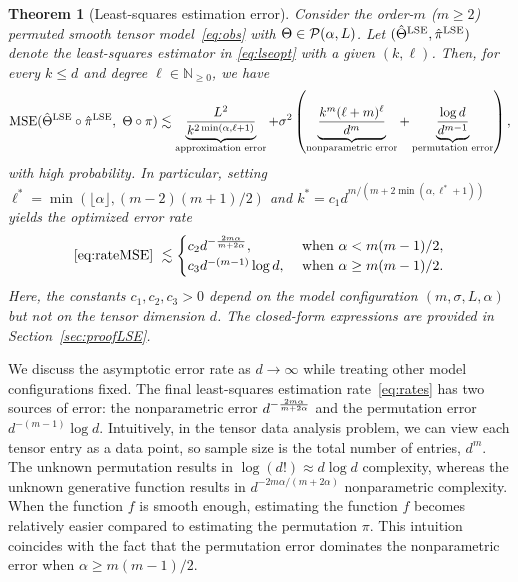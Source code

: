 \documentclass[11pt]{article}
\newtheorem{thm}{Theorem}
\theoremstyle{definition}
\newcommand*{\KeepStyleUnderBrace}[1]{%
  \mathop{%
    \mathchoice
    {\underbrace{\displaystyle#1}}%
    {\underbrace{\textstyle#1}}%
    {\underbrace{\scriptstyle#1}}%
    {\underbrace{\scriptscriptstyle#1}}%
  }\limits
}
\begin{document}
\begin{thm}[Least-squares estimation error]\label{thm:LSE} Consider the order-$m$ ($m\geq 2$) permuted smooth tensor model~\eqref{eq:obs} with $\Theta\in\mathcal{P}(\alpha,L)$.
Let $(\hat\Theta^{\textup{LSE}},\hat\pi^{\textup{LSE}})$ denote the least-squares estimator in \eqref{eq:lseopt} with a given $(k,\ell)$. Then, for every $k\leq d$ and degree $\ell\in \mathbb{N}_{\geq 0}$, we have
\begin{align}\label{eq:rateMSE}
\textup{MSE}(\hat\Theta^{\textup{LSE}}\circ\hat\pi^{\textup{LSE}},\ \Theta\circ\pi)\lesssim \KeepStyleUnderBrace{\frac{L^2}{k^{2\min(\alpha,\ell+1)}}}_{\textup{approximation error}}+ \sigma^2\left(\KeepStyleUnderBrace{\frac{k^m(\ell+m)^\ell}{d^m}}_{\textup{nonparametric error}}+\KeepStyleUnderBrace{\frac{\log d}{d^{m-1}}}_{\textup{permutation error}}\right),
\end{align}
with high probability. In particular, setting {\small $\ell^* = \min(\lfloor \alpha\rfloor,(m-2)(m+1)/2)$} and $k^*=c_1 d^{m/(m+2\min(\alpha,\ell^*+1))}$
yields the optimized error rate
\begin{align}\label{eq:rates}
     \eqref{eq:rateMSE}\ \lesssim 
     \begin{cases} 
    c_2 d^{-\frac{2m\alpha}{m+2\alpha}}, & \text{ when } \alpha < m(m-1)/2,\\
     c_3 d^{-(m-1)}\log d, &\text{ when } \alpha \geq m(m-1)/2.
    \end{cases}
\end{align}
Here, the constants $c_1,c_2,c_3>0$ depend on the model configuration $(m,\sigma, L,\alpha)$ but not on the tensor dimension $d$. The closed-form expressions are provided in Section~\ref{sec:proofLSE}.
\end{thm}

We discuss the asymptotic error rate as $d\rightarrow \infty$ while treating other model configurations fixed. The final least-squares estimation rate~\eqref{eq:rates} has two sources of error: the nonparametric error $d^{-{2m\alpha\over m+2\alpha}}$ and the permutation error $d^{-(m-1)}\log d$. Intuitively, in the tensor data analysis problem, we can view each tensor entry as a data point, so sample size is the total number of entries, $d^m$. The unknown permutation results in $\log(d!)\approx d\log d$ complexity, whereas the unknown generative function results in $d^{-2m\alpha/(m+2\alpha)}$ nonparametric complexity. When the function $f$ is smooth enough, estimating the function $f$ becomes relatively easier compared to estimating the permutation $\pi$. This intuition coincides with the fact that the permutation error dominates the nonparametric error when  $\alpha\geq m(m-1)/2$. 
\end{document}
